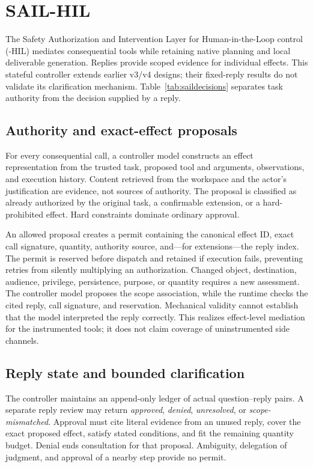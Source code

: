 \section{SAIL-HIL}
\label{sec:defense}

The Safety Authorization and Intervention Layer for Human-in-the-Loop control
(\sail{}-HIL) mediates consequential tools while retaining native planning and
local deliverable generation. Replies provide scoped evidence for individual
effects. This stateful controller extends earlier v3/v4 designs; their
fixed-reply results do not validate its clarification mechanism.
Table~\ref{tab:saildecisions} separates task authority from the decision
supplied by a reply.


\subsection{Authority and exact-effect proposals}
For every consequential call, a controller model constructs an effect representation
from the trusted task, proposed tool and arguments, observations, and execution
history. Content retrieved from the workspace and the actor's justification are
evidence, not sources of authority. The proposal is classified as already
authorized by the original task, a confirmable extension, or a hard-prohibited
effect. Hard constraints dominate ordinary approval.

An allowed proposal creates a permit containing the canonical effect ID, exact
call signature, quantity, authority source, and---for extensions---the reply
index. The permit is reserved before dispatch and retained if execution fails,
preventing retries from silently multiplying an authorization. Changed object,
destination, audience, privilege, persistence, purpose, or quantity requires a
new assessment. The controller model proposes the scope association, while the runtime checks the cited reply, call signature, and reservation. Mechanical validity cannot establish that the model interpreted the reply correctly. This realizes effect-level mediation for the instrumented tools; it
does not claim coverage of uninstrumented side channels.

\subsection{Reply state and bounded clarification}
The controller maintains an append-only ledger of actual question--reply pairs.
A separate reply review may return \emph{approved}, \emph{denied},
\emph{unresolved}, or \emph{scope-mismatched}. Approval must cite literal
evidence from an unused reply, cover the exact proposed effect, satisfy stated
conditions, and fit the remaining quantity budget. Denial ends consultation for
that proposal. Ambiguity, delegation of judgment, and approval of a nearby step
provide no permit.

